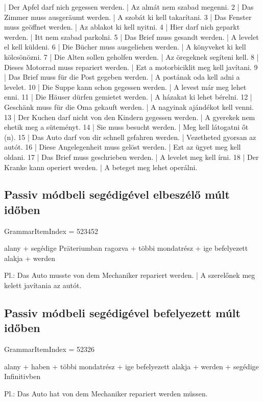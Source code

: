 \documentclass{article}
\newenvironment{desc}{\verbatim}{\endverbatim}
\newenvironment{exmp}{\verbatim}{\endverbatim}
\begin{document}
\begin{exmp}
1 | Der Apfel darf nich gegessen werden. | Az almát nem szabad megenni.
2 | Das Zimmer muss ausgeräumt werden. | A szobát ki kell takarítani.
3 | Das Fenster muss geöffnet werden. | Az ablakot ki kell nyitni.
4 | Hier darf nich geparkt werden. | Itt nem szabad parkolni.
5 | Das Brief muss gesandt werden. | A levelet el kell küldeni.
6 | Die Bücher muss ausgeliehen werden. | A könyveket ki kell kölcsönözni.
7 | Die Alten sollen geholfen werden. | Az öregeknek segíteni kell.
8 | Dieses Motorrad muss repariert werden. | Ezt a motorbiciklit meg kell javítani.
9 | Das Brief muss für die Post gegeben werden. | A postának oda kell adni a levelet.
10 | Die Suppe kann schon gegessen werden. | A levest már meg lehet enni.
11 | Die Häuser dürfen gemietet werden. | A házakat ki lehet bérelni.
12 | Geschänk muss für die Oma gekauft werden. | A nagyinak ajándékot kell venni.
13 | Der Kuchen darf nicht von den Kindern gegessen werden. | A gyerekek nem ehetik meg a süteményt.
14 | Sie muss besucht werden. | Meg kell látogatni őt (n).
15 | Das Auto darf von dir schnell gefahren werden. | Vezetheted gyorsan az autót.
16 | Diese Angelegenheit muss gelöst werden. | Ezt az ügyet meg kell oldani.
17 | Das Brief muss geschrieben werden. | A levelet meg kell írni.
18 | Der Kranke kann operiert werden. | A beteget meg lehet operálni.
\end{exmp}

\subsection{Passiv módbeli segédigével elbeszélő múlt időben}

GrammarItemIndex = 523452

\begin{desc}
alany + segédige Präteriumban ragozva + többi mondatrész + ige befelyezett alakja + werden

Pl.: Das Auto musste von dem Mechaniker repariert werden. | A szerelőnek meg kelett javítania az autót.
\end{desc}

\subsection{Passiv módbeli segédigével befelyezett múlt időben}

GrammarItemIndex = 52326

\begin{desc}
alany + haben + többi mondatrész + ige befelyezett alakja + werden + segédige Infinitivben

Pl.: Das Auto hat von dem Mechaniker repariert werden müssen.
\end{desc}
\end{document}
